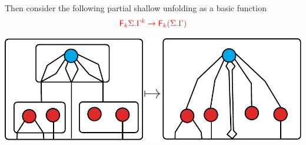 \begin{enumerate}
$$\begin{center}
\end{center}
Then consider the following partial shallow unfolding as a basic function
\begin{align*}
\ranked{\shallowterm{\reduce k \Sigma}{\Gamma^k} \to \reduce k (\shallowterm{\Sigma}{\Gamma})} 
\end{align*}
 \begin{center}
\includegraphics[scale=.4]{partial-shallow-unfold.pdf}
 \end{center}
\end{enumerate}

